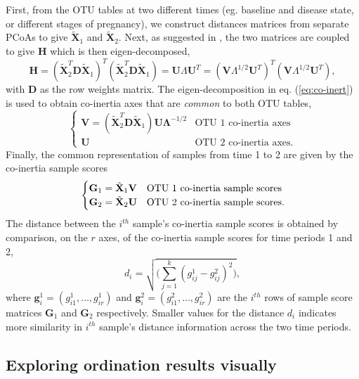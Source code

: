 \documentclass[doublespacing]{bmcart}
\def\H{\mathbf{H}}
\def\D{\mathbf{D}}
\def\U{\mathbf{U}}
\def\V{\mathbf{V}}
\def\X{\mathbf{X}}
\def\G{\mathbf{G}}
\begin{document}
First, from the OTU tables at two different times (eg. baseline and disease state, or different stages of pregnancy), we construct distances matrices from separate PCoAs to give $\tilde{\X}_{1}$  and $\tilde{\X}_{2}$. Next, as suggested in \cite{Dray3}, the two matrices are coupled to give $\H$ which is then eigen-decomposed, 
\begin{equation}\label{eq:co-inert}
\H = (\tilde{\X}_{2}^T\D \tilde{\X}_{1})^T  (\tilde{\X}_{2}^T \D \tilde{\X}_{1}) = \U\Lambda\U^T = (\V\Lambda^{1/2}\U^T)^T(\V\Lambda^{1/2}\U^T), 
\end{equation}
with $\D$ as the row weights matrix. The eigen-decomposition in eq. (\ref{eq:co-inert}) is used to obtain co-inertia axes that are {\it common} to both OTU tables, 
\begin{equation*}
 \begin{cases}
	 \V =  (\tilde{\X}_{2}^T\D \tilde{\X}_{1})\U\mathbf{\Lambda}^{-1/2}				& \text{OTU 1 co-inertia axes}\\
    	\U 									 									& \text{OTU 2 co-inertia axes}.
  \end{cases}
\end{equation*} 
Finally, the common representation of  samples from time 1 to 2 are given by the co-inertia sample scores 
\begin{equation}{\label{eq:G1G2}}
 \begin{cases}
    \G_{1} = \tilde{\X}_{1}\V								 			& \text{OTU 1 co-inertia sample scores} \\
    \G_{2} = 	\tilde{\X}_{2}\U  												& \text{OTU 2 co-inertia sample scores}.
  \end{cases}
\end{equation} 
The distance between the $i^{th}$ sample's co-inertia sample scores is obtained by comparison, on the $r$ axes, of the co-inertia sample scores for time periods 1 and 2,
\begin{equation}\label{eq:di}
d_i = \sqrt{\Big(\sum_{j=1}^k (g_{ij}^{1} - g_{ij}^{2})^2\Big)},  
\end{equation}
where $\boldsymbol g_i^{1} = (g_{i1}^{1}, \dots, g_{ir}^{1})$ and $\boldsymbol g_i^{2} = (g_{i1}^{2}, \dots, g_{ir}^{2})$ are the $i^{th}$ rows of sample score matrices $\G_{1}$ and $\G_{2}$ respectively. Smaller values for the distance $d_i$ indicates more similarity in  $i^{th}$ sample's distance information across the two time periods.  

\subsection*{Exploring ordination results visually}
\end{document}
